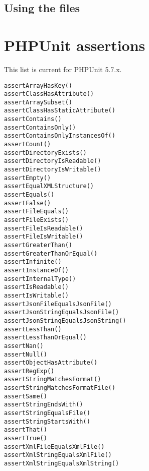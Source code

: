 \documentclass[a4paper,10pt,headsepline]{scrartcl}
\begin{document}
\subsection{Using the files}
\small
{}
\normalsize

\pagebreak
\section{PHPUnit assertions}
This list is current for PHPUnit 5.7.x.

\begin{verbatim}
assertArrayHasKey()
assertClassHasAttribute()
assertArraySubset()
assertClassHasStaticAttribute()
assertContains()
assertContainsOnly()
assertContainsOnlyInstancesOf()
assertCount()
assertDirectoryExists()
assertDirectoryIsReadable()
assertDirectoryIsWritable()
assertEmpty()
assertEqualXMLStructure()
assertEquals()
assertFalse()
assertFileEquals()
assertFileExists()
assertFileIsReadable()
assertFileIsWritable()
assertGreaterThan()
assertGreaterThanOrEqual()
assertInfinite()
assertInstanceOf()
assertInternalType()
assertIsReadable()
assertIsWritable()
assertJsonFileEqualsJsonFile()
assertJsonStringEqualsJsonFile()
assertJsonStringEqualsJsonString()
assertLessThan()
assertLessThanOrEqual()
assertNan()
assertNull()
assertObjectHasAttribute()
assertRegExp()
assertStringMatchesFormat()
assertStringMatchesFormatFile()
assertSame()
assertStringEndsWith()
assertStringEqualsFile()
assertStringStartsWith()
assertThat()
assertTrue()
assertXmlFileEqualsXmlFile()
assertXmlStringEqualsXmlFile()
assertXmlStringEqualsXmlString()
\end{verbatim}
\end{document}
